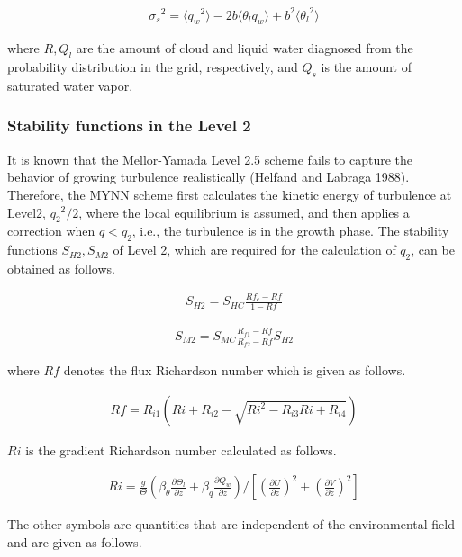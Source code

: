 \begin{eqnarray}{\sigma_s}^2=\langle {q_w}^2 \rangle -2b \langle \theta_l q_w \rangle + b^2\langle {\theta_l}^2 \rangle\end{eqnarray}

where \(R,Q_l\) are the amount of cloud and liquid water diagnosed from
the probability distribution in the grid, respectively, and \(Q_s\) is
the amount of saturated water vapor.

\hypertarget{stability-functions-in-the-level-2}{%
\subsubsection{Stability functions in the Level
2}\label{stability-functions-in-the-level-2}}

It is known that the Mellor-Yamada Level 2.5 scheme fails to capture the
behavior of growing turbulence realistically (Helfand and Labraga 1988).
Therefore, the MYNN scheme first calculates the kinetic energy of
turbulence at Level2, \({q_2}^2/2\), where the local equilibrium is
assumed, and then applies a correction when \(q<q_2\), i.e., the
turbulence is in the growth phase. The stability functions
\(S_{H2},S_{M2}\) of Level 2, which are required for the calculation of
\(q_2\), can be obtained as follows.

\begin{eqnarray}S_{H2}=S_{HC}\frac{Rf_c-Rf}{1-Rf}\end{eqnarray}

\begin{eqnarray}S_{M2}=S_{MC}\frac{R_{f1}-Rf}{R_{f2}-Rf}S_{H2}\end{eqnarray}

where \(Rf\) denotes the flux Richardson number which is given as
follows.

\begin{eqnarray}Rf=R_{i1}\left(Ri+R_{i2}-\sqrt{Ri^2-R_{i3}Ri+R_{i4}}\right)\end{eqnarray}

\(Ri\) is the gradient Richardson number calculated as follows.

\begin{eqnarray}Ri=\frac{g}{\Theta}\left(\beta_\theta \frac{\partial \Theta_l}{\partial z}+\beta_q \frac{\partial Q_w}{\partial z}\right) \Bigg/ \left[ \left(\frac{\partial U}{\partial z}\right)^2+\left(\frac{\partial V}{\partial z}\right)^2 \right]\end{eqnarray}

The other symbols are quantities that are independent of the
environmental field and are given as follows.

